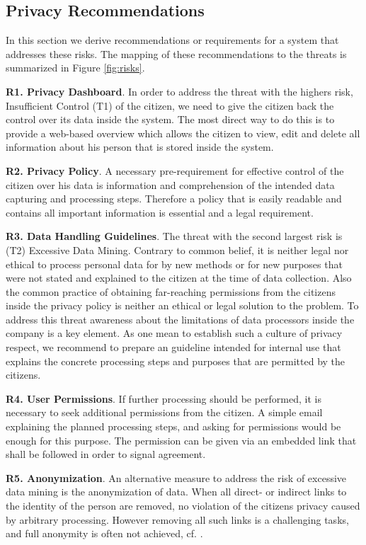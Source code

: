 \documentclass[runningheads,a4paper]{llncs}
\begin{document}
\subsection{Privacy Recommendations}
\label{subsec:priv-rec}

In this section we derive recommendations or
requirements for a system that addresses these risks. The mapping of these recommendations to the threats is summarized in Figure \ref{fig:risks}.

\textbf{R1. Privacy Dashboard}. In order to address the threat with the highers risk, Insufficient Control (T1) of the citizen, we need to give the citizen back the
control over its data inside the system. The most direct way to do
this is to provide a web-based overview which allows the citizen to view, edit and delete all information about his person
that is stored inside the system. 

\textbf{R2. Privacy Policy}. A necessary pre-requirement for effective control of the citizen over his data is information and comprehension of the intended data capturing and processing steps. Therefore a policy that
is easily readable and contains all important information is essential and a legal requirement.

\textbf{R3. Data Handling Guidelines}. The threat with the second largest risk is (T2) Excessive Data Mining.
Contrary to common belief, it is neither legal nor ethical to process
personal data for by new methods or for new purposes that were not
stated and explained to the citizen at the time of data
collection. Also the common practice of obtaining far-reaching
permissions from the citizens inside the privacy policy is neither an
ethical or legal solution to the problem. To address this threat awareness about the limitations of data
processors inside the company is a key element. As one mean to
establish such a culture of privacy respect, we recommend to prepare
an guideline intended for internal use that explains the concrete processing steps and purposes that are permitted by the citizens. 

\textbf{R4. User Permissions}. If further processing should be performed, it is necessary to seek additional permissions from the citizen. A simple email explaining the planned processing steps, and asking for permissions would be enough for this purpose. The permission can be given via an embedded link that shall be followed in order to signal agreement.

\textbf{R5. Anonymization}. An alternative measure to address the risk of excessive data mining is the anonymization of data. When all direct- or indirect
links to the identity of the person are removed, no violation of the
citizens privacy caused by arbitrary processing. However removing all
such links is a challenging tasks, and full anonymity is often not
achieved, cf. \cite{krumm2009}.
\end{document}
